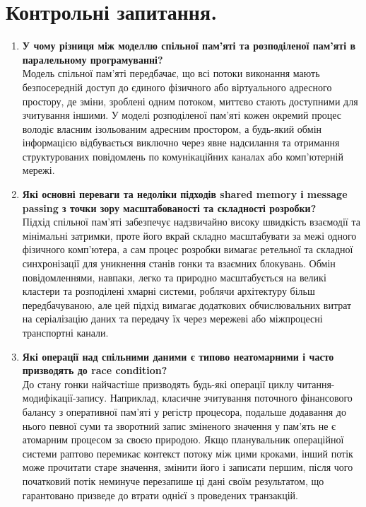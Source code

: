 \documentclass[14pt, a4paper]{extreport}
\begin{document}
	\section*{Контрольні запитання.}
	
	\begin{enumerate}
		\item \textbf{У чому різниця між моделлю спільної пам’яті та розподіленої пам’яті в паралельному програмуванні?} \\ Модель спільної пам'яті передбачає, що всі потоки виконання мають безпосередній доступ до єдиного фізичного або віртуального адресного простору, де зміни, зроблені одним потоком, миттєво стають доступними для зчитування іншими. У моделі розподіленої пам'яті кожен окремий процес володіє власним ізольованим адресним простором, а будь-який обмін інформацією відбувається виключно через явне надсилання та отримання структурованих повідомлень по комунікаційних каналах або комп'ютерній мережі.
		
		\item \textbf{Які основні переваги та недоліки підходів shared memory і message passing з точки зору масштабованості та складності розробки?} \\ Підхід спільної пам'яті забезпечує надзвичайно високу швидкість взаємодії та мінімальні затримки, проте його вкрай складно масштабувати за межі одного фізичного комп'ютера, а сам процес розробки вимагає ретельної та складної синхронізації для уникнення станів гонки та взаємних блокувань. Обмін повідомленнями, навпаки, легко та природно масштабується на великі кластери та розподілені хмарні системи, роблячи архітектуру більш передбачуваною, але цей підхід вимагає додаткових обчислювальних витрат на серіалізацію даних та передачу їх через мережеві або міжпроцесні транспортні канали.
		
		\item \textbf{Які операції над спільними даними є типово неатомарними і часто призводять до race condition?} \\ До стану гонки найчастіше призводять будь-які операції циклу читання-модифікації-запису. Наприклад, класичне зчитування поточного фінансового балансу з оперативної пам'яті у регістр процесора, подальше додавання до нього певної суми та зворотний запис зміненого значення у пам'ять не є атомарним процесом за своєю природою. Якщо планувальник операційної системи раптово перемикає контекст потоку між цими кроками, інший потік може прочитати старе значення, змінити його і записати першим, після чого початковий потік неминуче перезапише ці дані своїм результатом, що гарантовано призведе до втрати однієї з проведених транзакцій.
		

\end{enumerate}
\end{document}
